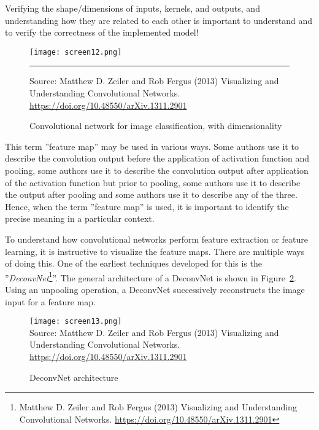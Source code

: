 \begin{alertbox}
Verifying the shape/dimensions of inputs, kernels, and outputs, and understanding how they are related to each other is important to understand and to verify the correctness of the implemented model!
\end{alertbox}

\begin{figure}
\centering
\texttt{[image: screen12.png]}  \\
\vspace{\baselineskip}

\hrule

\vspace{\baselineskip}
\scriptsize Source: Matthew D. Zeiler and Rob Fergus (2013) Visualizing and Understanding Convolutional Networks. \url{https://doi.org/10.48550/arXiv.1311.2901}

\caption{Convolutional network for image classification, with dimensionality}
\label{fig:screen12}
\end{figure}


\begin{infobox}
This term ''feature map'' may be used in various ways. Some authors use it to describe the convolution output before the application of activation function and pooling, some authors use it to describe the convolution output after application of the activation function but prior to pooling, some authors use it to describe the output after pooling and some authors use it to describe any of the three. Hence, when the term ''feature map'' is used, it is important to identify the precise meaning in a particular context.
\end{infobox}

To understand how convolutional networks perform feature extraction or feature learning, it is instructive to visualize the feature maps. There are multiple ways of doing this. One of the earliest techniques developed for this is the ''\emph{DeconvNet}\footnote{Matthew D. Zeiler and Rob Fergus (2013) Visualizing and Understanding Convolutional Networks. \url{https://doi.org/10.48550/arXiv.1311.2901}}''. The general architecture of a DeconvNet is shown in Figure~\ref{fig:screen13}. Using an unpooling operation, a DeconvNet successively reconstructs the image input for a feature map. 

\begin{figure}
\centering
\texttt{[image: screen13.png]} \\

\vspace{\baselineskip}
\scriptsize Source: Matthew D. Zeiler and Rob Fergus (2013) Visualizing and Understanding Convolutional Networks. \url{https://doi.org/10.48550/arXiv.1311.2901}
\caption{DeconvNet architecture}
\label{fig:screen13}
\end{figure}

